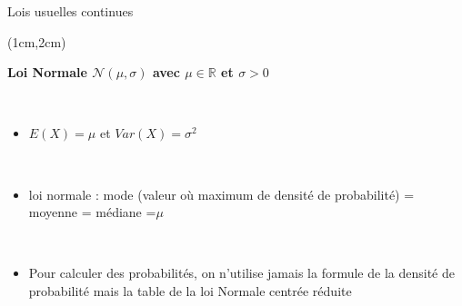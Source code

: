 \documentclass{beamer}
\begin{document}
\begin{frame}{Lois usuelles continues}
\begin{textblock*}{\textwidth}(1cm,2cm)

\begin{center}{\bf \Large Loi Normale $\mathcal{N}(\mu,\sigma)$ avec $\mu\in \mathbb{R}$ et $\sigma>0$} \end{center}

\

\begin{itemize}
\item  $E(X)=\mu$ et $Var(X)=\sigma^2$

\

\item loi normale :  mode (valeur où maximum de densité de probabilité) = moyenne = médiane =$\mu$

\

\item Pour calculer des probabilités, on n'utilise jamais la formule de la densité de probabilité mais la table de la loi Normale centrée réduite 


\end{itemize}


 


\end{textblock*}

\end{frame}

\end{document}
